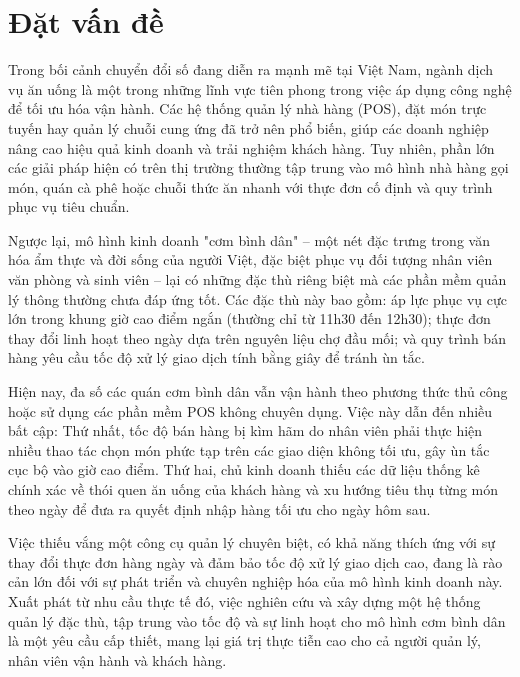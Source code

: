 \documentclass[../20232006p.tex]{subfiles}
\begin{document}
\section{Đặt vấn đề}
\label{section:1.1}
Trong bối cảnh chuyển đổi số đang diễn ra mạnh mẽ tại Việt Nam, ngành dịch vụ ăn uống là một trong những lĩnh vực tiên phong trong việc áp dụng công nghệ để tối ưu hóa vận hành. Các hệ thống quản lý nhà hàng (POS), đặt món trực tuyến hay quản lý chuỗi cung ứng đã trở nên phổ biến, giúp các doanh nghiệp nâng cao hiệu quả kinh doanh và trải nghiệm khách hàng. Tuy nhiên, phần lớn các giải pháp hiện có trên thị trường thường tập trung vào mô hình nhà hàng gọi món, quán cà phê hoặc chuỗi thức ăn nhanh với thực đơn cố định và quy trình phục vụ tiêu chuẩn.

Ngược lại, mô hình kinh doanh "cơm bình dân" – một nét đặc trưng trong văn hóa ẩm thực và đời sống của người Việt, đặc biệt phục vụ đối tượng nhân viên văn phòng và sinh viên – lại có những đặc thù riêng biệt mà các phần mềm quản lý thông thường chưa đáp ứng tốt. Các đặc thù này bao gồm: áp lực phục vụ cực lớn trong khung giờ cao điểm ngắn (thường chỉ từ 11h30 đến 12h30); thực đơn thay đổi linh hoạt theo ngày dựa trên nguyên liệu chợ đầu mối; và quy trình bán hàng yêu cầu tốc độ xử lý giao dịch tính bằng giây để tránh ùn tắc.

Hiện nay, đa số các quán cơm bình dân vẫn vận hành theo phương thức thủ công hoặc sử dụng các phần mềm POS không chuyên dụng. Việc này dẫn đến nhiều bất cập: Thứ nhất, tốc độ bán hàng bị kìm hãm do nhân viên phải thực hiện nhiều thao tác chọn món phức tạp trên các giao diện không tối ưu, gây ùn tắc cục bộ vào giờ cao điểm. Thứ hai, chủ kinh doanh thiếu các dữ liệu thống kê chính xác về thói quen ăn uống của khách hàng và xu hướng tiêu thụ từng món theo ngày để đưa ra quyết định nhập hàng tối ưu cho ngày hôm sau.

Việc thiếu vắng một công cụ quản lý chuyên biệt, có khả năng thích ứng với sự thay đổi thực đơn hàng ngày và đảm bảo tốc độ xử lý giao dịch cao, đang là rào cản lớn đối với sự phát triển và chuyên nghiệp hóa của mô hình kinh doanh này. Xuất phát từ nhu cầu thực tế đó, việc nghiên cứu và xây dựng một hệ thống quản lý đặc thù, tập trung vào tốc độ và sự linh hoạt cho mô hình cơm bình dân là một yêu cầu cấp thiết, mang lại giá trị thực tiễn cao cho cả người quản lý, nhân viên vận hành và khách hàng.
\end{document}
